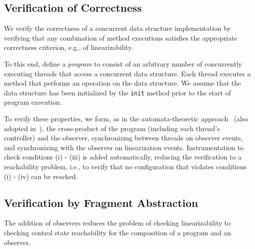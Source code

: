 \subsection{Verification of Correctness}
We verify the correctness of a concurrent data structure implementation by
verifying that any combination of method executions satisfies the
appropriate correctness criterion, e.g., of linearizability.

To this end, define a {\em program} to consist 
of an arbitrary number of concurrently executing threads
that access a concurrent data structure.
%
Each thread executes a method that performs an operation
on the data structure. We assume that the data structure has been initialized
by the {\tt init} method prior to the start of program execution.

To verify these properties, we
form, as in the automata-theoretic approach~\cite{VW:modelchecking}
(also adopted in~\cite{AHHR:integrated}),
the cross-product of the program (including each thread's controller) and
the observer, synchronizing between threads on observer events, and
synchronizing with the observer on linearization events.
Instrumentation to check conditions 
(i) - (iii) is added automatically, reducing the verification to a
reachability problem, i.e., to verify that no configuration that violates
conditions (i) - (iv) can be reached.


\subsection{Verification by Fragment Abstraction}

The addition of observers reduces the problem of checking linearizability to
checking control state reachability for the composition of a program and
an observer.

